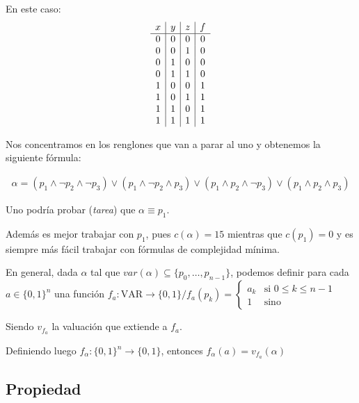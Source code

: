 \begin{enumerate}
        En este caso:
        \begin{gather*}
            \begin{array}{c | c | c | c}
                x & y & z & f \\
                \hline 
                0 & 0 & 0 & 0 \\
                0 & 0 & 1 & 0 \\
                0 & 1 & 0 & 0 \\
                0 & 1 & 1 & 0 \\
                1 & 0 & 0 & 1 \\
                1 & 0 & 1 & 1  \\
                1 & 1 & 0 & 1  \\
                1 & 1 & 1 & 1 
            \end{array}
        \end{gather*}

        Nos concentramos en los renglones que van a parar al uno y
        obtenemos la siguiente fórmula:

        \begin{gather*}
            \alpha = (p_1 \wedge \neg p_2 \wedge \neg p_3) \vee
            (p_1 \wedge \neg p_2 \wedge p_3) \vee 
            (p_1 \wedge p_2 \wedge \neg p_3) \vee (p_1 \wedge p_2 \wedge p_3)
        \end{gather*}

        \medskip
        Uno podría probar (\textit{tarea}) que $\alpha \equiv p_1$.

        Además es mejor trabajar con $p_1$, pues $c(\alpha) = 15$ mientras 
        que $c(p_1) = 0$ y es siempre más fácil trabajar con fórmulas de 
        complejidad mínima.
\end{enumerate}

En general, dada $\alpha$ tal que
$var(\alpha) \subseteq \{ p_0, \dotsc, p_{n-1} \}$, podemos
definir para cada $a \in {\{ 0, 1 \}}^n$ una función
$f_a : \mathrm{VAR} \to \{ 0, 1 \} /
f_a(p_k) = \begin{cases}
    a_k & \text{si } 0 \leq k \leq n-1 \\
    1 & \text{sino}
\end{cases}$

Siendo $v_{f_a}$ la valuación que extiende a $f_a$.

Definiendo luego $f_\alpha : {\{ 0, 1 \}}^n \to \{ 0, 1 \}$, entonces
$f_\alpha(a) = v_{f_a} (\alpha)$

\subsection{Propiedad}

